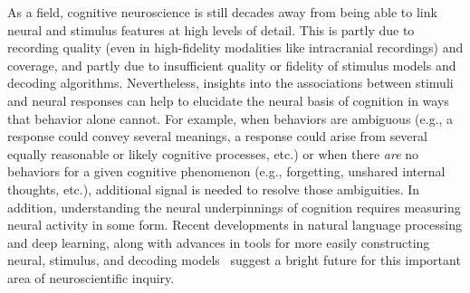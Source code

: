 \documentclass[runningheads]{llncs}
\begin{document}
As a field, cognitive neuroscience is still decades away from being
able to link neural and stimulus features at high levels of detail.
This is partly due to recording quality (even in high-fidelity
modalities like intracranial recordings) and coverage, and partly due
to insufficient quality or fidelity of stimulus models and decoding
algorithms.  Nevertheless, insights into the associations between
stimuli and neural responses can help to elucidate the neural basis of
cognition in ways that behavior alone cannot.  For example, when
behaviors are ambiguous (e.g., a response could convey several
meanings, a response could arise from several equally reasonable or
likely cognitive processes, etc.) or when there \textit{are} no
behaviors for a given cognitive phenomenon (e.g., forgetting, unshared
internal thoughts, etc.), additional signal is needed to resolve those
ambiguities.  In addition, understanding the neural underpinnings of
cognition requires measuring neural activity in some form.
Recent developments in natural language processing and deep learning,
along with advances in tools for more easily constructing neural,
stimulus, and decoding models~\citep[e.g.,][]{GelmEtal15, AbadEtal16,
  PaszEtal19} suggest a bright future for this important area of
neuroscientific inquiry.
\end{document}
